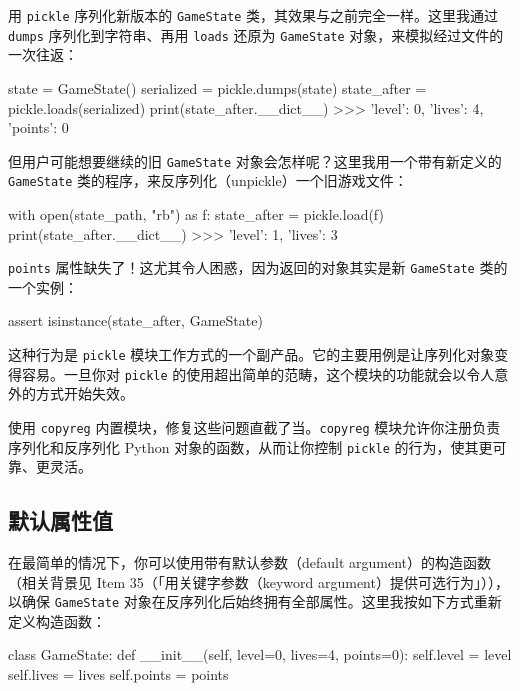 用 \texttt{pickle} 序列化新版本的 \texttt{GameState} 类，其效果与之前完全一样。这里我通过 \texttt{dumps} 序列化到字符串、再用 \texttt{loads} 还原为 \texttt{GameState} 对象，来模拟经过文件的一次往返：

\begin{codebox}[python]
state = GameState()
serialized = pickle.dumps(state)
state_after = pickle.loads(serialized)
print(state_after.__dict__)
>>>
{'level': 0, 'lives': 4, 'points': 0}
\end{codebox}

但用户可能想要继续的旧 \texttt{GameState} 对象会怎样呢？这里我用一个带有新定义的 \texttt{GameState} 类的程序，来反序列化（unpickle）一个旧游戏文件：

\begin{codebox}[python]
with open(state_path, "rb") as f:
    state_after = pickle.load(f)
print(state_after.__dict__)
>>>
{'level': 1, 'lives': 3}
\end{codebox}

\texttt{points} 属性缺失了！这尤其令人困惑，因为返回的对象其实是新 \texttt{GameState} 类的一个实例：

\begin{codebox}[python]
assert isinstance(state_after, GameState)
\end{codebox}

这种行为是 \texttt{pickle} 模块工作方式的一个副产品。它的主要用例是让序列化对象变得容易。一旦你对 \texttt{pickle} 的使用超出简单的范畴，这个模块的功能就会以令人意外的方式开始失效。

使用 \texttt{copyreg} 内置模块，修复这些问题直截了当。\texttt{copyreg} 模块允许你注册负责序列化和反序列化 Python 对象的函数，从而让你控制 \texttt{pickle} 的行为，使其更可靠、更灵活。

\subsection{默认属性值}

在最简单的情况下，你可以使用带有默认参数（default argument）的构造函数（相关背景见 Item 35（「用关键字参数（keyword argument）提供可选行为」）），以确保 \texttt{GameState} 对象在反序列化后始终拥有全部属性。这里我按如下方式重新定义构造函数：

\begin{codebox}[python]
class GameState:
    def __init__(self, level=0, lives=4, points=0):
        self.level = level
        self.lives = lives
        self.points = points
\end{codebox}

